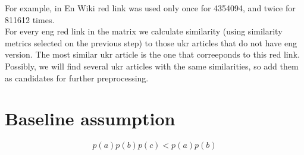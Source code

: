 \documentclass[11pt,a4paper]{article}
\begin{document}
For example, in En Wiki red link was used only once for 4354094, and twice for 811612 times.\\

For every eng red link in the matrix we calculate similarity (using similarity metrics selected on the previous step) to those ukr articles that do not have eng version. The most similar ukr article is the one that correeponds to this red link. Possibly, we will find several ukr articles with the same similarities, so add them as candidates for further preprocessing.

\section{Baseline assumption}

\[ p(a)p(b)p(c) < p(a)p(b) \]
\end{document}
